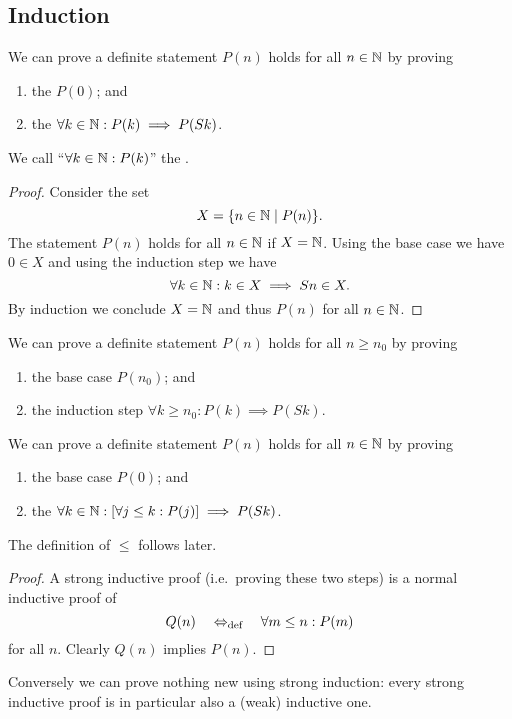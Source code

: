 \subsection{Induction}
\begin{lemma}
We can prove a definite statement $P(n)$ holds for all $n\in \mathbb{N}$ by proving
\begin{enumerate}
\item the  $P(0)$; and
\item the  $\forall k\in \mathbb{N}: P(k)\implies P(Sk)$.
\end{enumerate}
We call ``$\forall k\in \mathbb{N}: P(k)$'' the .
\end{lemma}
\begin{proof}
Consider the set
\[ X = \{ n\in \mathbb{N}\;|\; P(n) \}. \]
The statement $P(n)$ holds for all $n\in \mathbb{N}$ if $X=\mathbb{N}$. Using the base case we have $0\in X$ and using the induction step we have
\[ \forall k\in\mathbb{N}: k\in X \implies Sn\in X. \]
By induction we conclude $X=\mathbb{N}$ and thus $P(n)$ for all $n\in \mathbb{N}$.
\end{proof}
\begin{corollary}
We can prove a definite statement $P(n)$ holds for all $n\geq n_0$ by proving
\begin{enumerate}
\item the base case $P(n_0)$; and
\item the induction step $\forall k\geq n_0: P(k)\implies P(Sk)$.
\end{enumerate}
\end{corollary}

\begin{lemma}
We can prove a definite statement $P(n)$ holds for all $n\in \mathbb{N}$ by proving
\begin{enumerate}
\item the base case $P(0)$; and
\item the  $\forall k\in \mathbb{N}: [\forall j\leq k:  P(j)] \implies P(Sk)$.
\end{enumerate}
\end{lemma}
The definition of $\leq$ follows later.
\begin{proof}
A strong inductive proof (i.e.\ proving these two steps) is a normal inductive proof of
\[ Q(n) \quad\Leftrightarrow_{\text{def}}\quad \forall m\leq n: P(m) \]
for all $n$. Clearly $Q(n)$ implies $P(n)$.
\end{proof}
Conversely we can prove nothing new using strong induction: every strong inductive proof is in particular also a (weak) inductive one.

